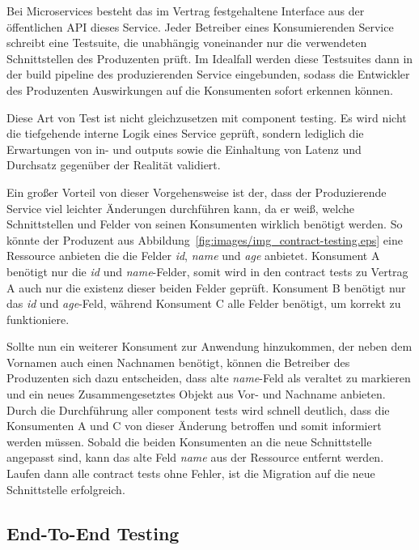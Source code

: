 \documentclass[12pt,a4paper,bibliography=totocnumbered,listof=totocnumbered]{scrartcl}
\begin{document}
Bei Microservices besteht das im Vertrag festgehaltene Interface aus der öffentlichen \ac{API} dieses Service. Jeder Betreiber eines Konsumierenden Service schreibt eine Testsuite, die unabhängig voneinander nur die verwendeten Schnittstellen des Produzenten prüft. Im Idealfall werden diese Testsuites dann in der build pipeline des produzierenden Service eingebunden, sodass die Entwickler des Produzenten Auswirkungen auf die Konsumenten sofort erkennen können.\cite{clemson}

Diese Art von Test ist nicht gleichzusetzen mit component testing. Es wird nicht die tiefgehende interne Logik eines Service geprüft, sondern lediglich die Erwartungen von in- und outputs sowie die Einhaltung von Latenz und Durchsatz gegenüber der Realität validiert.\cite{clemson}


Ein großer Vorteil von dieser Vorgehensweise ist der, dass der Produzierende Service viel leichter Änderungen durchführen kann, da er weiß, welche Schnittstellen und Felder von seinen Konsumenten wirklich benötigt werden. So könnte der Produzent aus Abbildung~\ref{fig:images/img_contract-testing.eps} eine Ressource anbieten die die Felder \textit{id}, \textit{name} und \textit{age} anbietet. Konsument A benötigt nur die \textit{id} und \textit{name}-Felder, somit wird in den contract tests zu Vertrag A auch nur die existenz dieser beiden Felder geprüft. Konsument B benötigt nur das \textit{id} und \textit{age}-Feld, während Konsument C alle Felder benötigt, um korrekt zu funktioniere.\cite{clemson}

Sollte nun ein weiterer Konsument zur Anwendung hinzukommen, der neben dem Vornamen auch einen Nachnamen benötigt, können die Betreiber des Produzenten sich dazu entscheiden, dass alte \textit{name}-Feld als veraltet zu markieren und ein neues Zusammengesetztes Objekt aus Vor- und Nachname anbieten. Durch die Durchführung aller component tests wird schnell deutlich, dass die Konsumenten A und C von dieser Änderung betroffen und somit informiert werden müssen. Sobald die beiden Konsumenten an die neue Schnittstelle angepasst sind, kann das alte Feld \textit{name} aus der Ressource entfernt werden. Laufen dann alle contract tests ohne Fehler, ist die Migration auf die neue Schnittstelle erfolgreich.\cite{clemson}

\subsection{End-To-End Testing}
\end{document}
